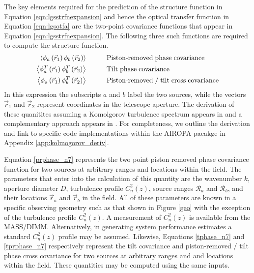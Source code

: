 The key elements required for the prediction of the structure function
in Equation \ref{eqn:lgsstrfnexpansion} and hence the optical transfer
function in Equation \ref{eqn:lgsotfa} are the two-point covariance
functions that appear in Equation \ref{eqn:lgsstrfnexpansion}.  The
following three such functions are required to compute the structure
function.
\begin{equation}\label{tpcf}
\begin{aligned}
\left\langle \phi_{a}\left(\vec{r}_{1}\right) \phi_{b}\left(\vec{r}_{2}\right) \right\rangle &\quad\quad\quad {\rm Piston\text{-}removed\;phase\;covariance} \\
\left\langle \phi^{T}_{a}\left(\vec{r}_{1}\right) \phi^{T}_{b}\left(\vec{r}_{2}\right) \right\rangle &\quad\quad\quad {\rm Tilt\;phase\;covariance} \\
\left\langle \phi_{a}\left(\vec{r}_{1}\right) \phi^{T}_{b}\left(\vec{r}_{2}\right) \right\rangle &\quad\quad\quad {\rm Piston\text{-}removed\;/\;tilt\;cross\;covariance} \\
\end{aligned}
\end{equation}
In this expression the subscripts $a$ and $b$ label the two sources,
while the vectors $\vec{r}_{1}$ and $\vec{r}_{2}$
represent coordinates in the telescope aperture.  
The derivation of these quanitites assuming a Komolgorov
turbulence spectrum appears in
\cite{Tyler:1994a} and a complementary approach appears in 
\cite{Sasiela:2012}.
For completeness, we outline the derivation and 
link to specific code implementations within the AIROPA
pacakge in Appendix \ref{app:kolmogorov_deriv}. 


Equation \ref{prphase_n7} represents the two point piston removed
phase covariance function for two sources at arbitrary ranges and
locations within the field.  The parameters that enter into the
calculation of this quantity are the wavenumber $k$, aperture diameter
$D$, turbulence profile $C_{n}^{2}(z)$, source ranges
$\mathcal{R}_{a}$ and $\mathcal{R}_{b}$, and their locations
$\vec{r}_{a}$ and $\vec{r}_{b}$ in the field.  All of
these parameters are known in a specific observing geometry such as
that shown in Figure \ref{geo} with the exception of the turbulence
profile $C_{n}^{2}(z)$.  A measurement of $C_{n}^{2}(z)$ is available
from the MASS/DIMM.  Alternatively, in generating system performance
estimates a standard $C_{n}^{2}(z)$ profile may be assumed.  Likewise,
Equations \ref{tphase_n7} and \ref{tprphase_n7} respectively represent
the tilt covariance and piston-removed / tilt phase cross covariance
for two sources at arbitrary ranges and and locations within the
field.  These quantities may be computed using the same inputs.

